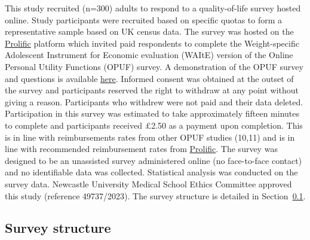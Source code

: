 \documentclass[
  letterpaper,
  DIV=11,
  numbers=noendperiod]{scrartcl}
\begin{document}
This study recruited (n=300) adults to respond to a quality-of-life
survey hosted online. Study participants were recruited based on
specific quotas to form a representative sample based on UK census data.
The survey was hosted on the \href{https://www.prolific.com}{Prolific}
platform which invited paid respondents to complete the Weight-specific
Adolescent Instrument for Economic evaluation (WAItE) version of the
Online Personal Utility Functions (OPUF) survey. A demonstration of the
OPUF survey and questions is available
\href{https://survey.valorem.health/waite_opuf_adult2}{here}. Informed
consent was obtained at the outset of the survey and participants
reserved the right to withdraw at any point without giving a reason.
Participants who withdrew were not paid and their data deleted.
Participation in this survey was estimated to take approximately fifteen
minutes to complete and participants received £2.50 as a payment upon
completion. This is in line with reimbursements rates from other OPUF
studies (10,11) and is in line with recommended reimbursement rates from
\href{https://www.prolific.com}{Prolific}. The survey was designed to be
an unassisted survey administered online (no face-to-face contact) and
no identifiable data was collected. Statistical analysis was conducted
on the survey data. Newcastle University Medical School Ethics Committee
approved this study (reference 49737/2023). The survey structure is
detailed in Section~\ref{sec-surveystructure}.

\subsection{Survey structure}\label{sec-surveystructure}
\end{document}
